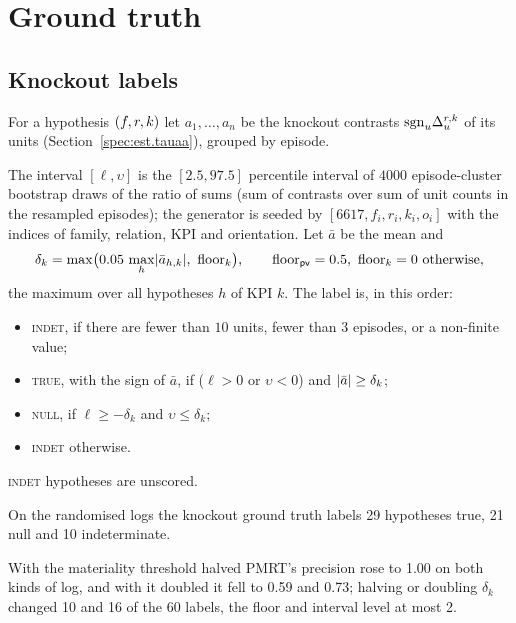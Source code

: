 \section{Ground truth}
\label{spec:gt}

\subsection{Knockout labels}
\label{spec:gt.label}

For a hypothesis $(f, r, k)$ let $a_1, \dots, a_n$ be the knockout contrasts $\mathrm{sgn}_u \Delta_u^{r,k}$ of its units (Section~\ref{spec:est.tauaa}), grouped by episode.

\begin{definition}
The interval $[\ell, \upsilon]$ is the $[2.5, 97.5]$ percentile interval of $4000$ episode-cluster bootstrap draws of the ratio of sums (sum of contrasts over sum of unit counts in the resampled episodes); the generator is seeded by $[6617, f_i, r_i, k_i, o_i]$ with the indices of family, relation, KPI and orientation. Let $\bar a$ be the mean and
\begin{equation*}
\delta_k = \max\bigl(0.05\,\max_h \lvert \bar a_{h,k}\rvert,\ \mathrm{floor}_k\bigr), \qquad \mathrm{floor}_{\mathsf{pv}} = 0.5,\ \mathrm{floor}_k = 0 \text{ otherwise,}
\end{equation*}
the maximum over all hypotheses $h$ of KPI $k$. The label is, in this order:
\begin{itemize}
\item \textsc{indet}, if there are fewer than $10$ units, fewer than $3$ episodes, or a non-finite value;
\item \textsc{true}, with the sign of $\bar a$, if ($\ell > 0$ or $\upsilon < 0$) and $\lvert \bar a\rvert \ge \delta_k$;
\item \textsc{null}, if $\ell \ge -\delta_k$ and $\upsilon \le \delta_k$;
\item \textsc{indet} otherwise.
\end{itemize}
\end{definition}

\noindent \textsc{indet} hypotheses are unscored.


On the randomised logs the knockout ground truth labels 29 hypotheses true, 21 null and 10 indeterminate.

With the materiality threshold halved PMRT's precision rose to 1.00 on both kinds of log, and with it doubled it fell to 0.59 and 0.73; halving or doubling $\delta_k$ changed 10 and 16 of the 60 labels, the floor and interval level at most 2.

